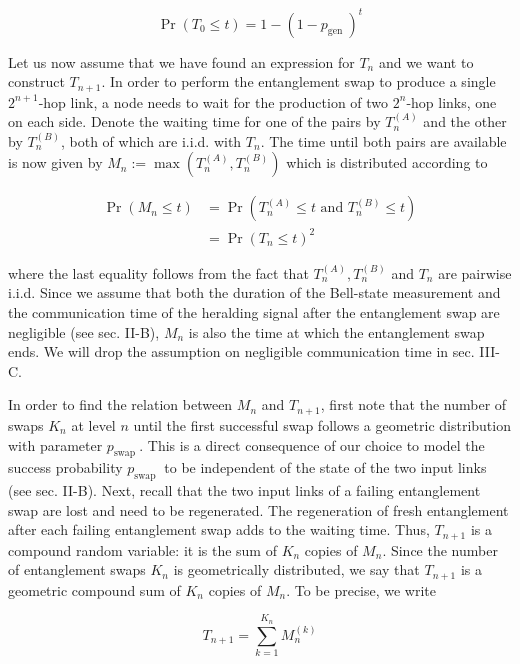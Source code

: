 \documentclass[10pt]{article}
\begin{document}
\begin{equation*}
\operatorname{Pr}\left(T_{0} \leq t\right)=1-\left(1-p_{\text {gen }}\right)^{t} \tag{11}
\end{equation*}


Let us now assume that we have found an expression for $T_{n}$ and we want to construct $T_{n+1}$. In order to perform the entanglement swap to produce a single $2^{n+1}$-hop link, a node needs to wait for the production of two $2^{n}$-hop links, one on each side. Denote the waiting time for one of the pairs by $T_{n}^{(A)}$ and the other by $T_{n}^{(B)}$, both of which are i.i.d. with $T_{n}$. The time until both pairs are available is now given by $M_{n}:=\max \left(T_{n}^{(A)}, T_{n}^{(B)}\right)$ which is distributed according to


\begin{align*}
\operatorname{Pr}\left(M_{n} \leq t\right) & =\operatorname{Pr}\left(T_{n}^{(A)} \leq t \text { and } T_{n}^{(B)} \leq t\right) \\
& =\operatorname{Pr}\left(T_{n} \leq t\right)^{2} \tag{12}
\end{align*}


where the last equality follows from the fact that $T_{n}^{(A)}, T_{n}^{(B)}$ and $T_{n}$ are pairwise i.i.d. Since we assume that both the duration of the Bell-state measurement and the communication time of the heralding signal after the entanglement swap are negligible (see sec. II-B), $M_{n}$ is also the time at which the entanglement swap ends. We will drop the assumption on negligible communication time in sec. III-C.

In order to find the relation between $M_{n}$ and $T_{n+1}$, first note that the number of swaps $K_{n}$ at level $n$ until the first successful swap follows a geometric distribution with parameter $p_{\text {swap }}$. This is a direct consequence of our choice to model the success probability $p_{\text {swap }}$ to be independent of the state of the two input links (see sec. II-B). Next, recall that the two input links of a failing entanglement swap are lost and need to be regenerated. The regeneration of fresh entanglement after each failing entanglement swap adds to the waiting time. Thus, $T_{n+1}$ is a compound random variable: it is the sum of $K_{n}$ copies of $M_{n}$. Since the number of entanglement swaps $K_{n}$ is geometrically distributed, we say that $T_{n+1}$ is a geometric compound sum of $K_{n}$ copies of $M_{n}$. To be precise, we write


\begin{equation*}
T_{n+1}=\sum_{k=1}^{K_{n}} M_{n}^{(k)} \tag{13}
\end{equation*}
\end{document}
